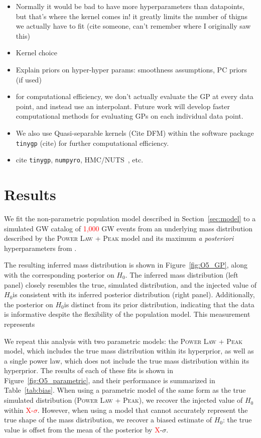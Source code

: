 \documentclass[]{aastex631}
\newcommand{\Ho}{$H_0$}
\newcommand{\plp}{\textsc{Power Law + Peak}}
\newcommand{\result}[1]{\textcolor{red}{#1}}
\begin{document}
\begin{itemize}
    \item Normally it would be bad to have more hyperparameters than datapoints, but that's where the kernel comes in! it greatly limits the number of thigns we actually have to fit (cite someone, can't remember where I originally saw this)
    \item Kernel choice   
    \item Explain priors on hyper-hyper params: smoothness assumptions, PC priors~\citep{simpson_penalising_2017} (if used)
    \item for computational efficiency, we don't actually evaluate the GP at every data point, and instead use an interpolant. Future work will develop faster computational methods for evaluating GPs on each individual data point.
    \item We also use Quasi-separable kernels (Cite DFM) within the software package \texttt{tinygp} (cite) for further computational efficiency. 
    \item cite \texttt{tinygp}, \texttt{numpyro}, HMC/NUTS~\citep{hoffman_no-u-turn_2011}, etc.
\end{itemize}
\section{Results}
\label{sec:results}
We fit the non-parametric population model described in Section~\ref{sec:model} to a simulated GW catalog of \result{1,000} GW events from an underlying mass distribution described by the \plp{} model and its maximum \emph{a posteriori} hyperparameters from \citet{o3b_pop}.

The resulting inferred mass distribution is shown in Figure~\ref{fig:O5_GP}, along with the corresponding posterior on \Ho.
The inferred mass distribution (left panel) closely resembles the true, simulated distribution, and the injected value of \Ho is consistent with its inferred posterior distribution (right panel).
Additionally, the posterior on \Ho is distinct from its prior distribution, indicating that the data is informative despite the flexibility of the population model.
This measurement represents 

We repeat this analysis with two parametric models: the \plp{} model, which includes the true mass distribution within its hyperprior, as well as a single power law, which does not include the true mass distribution within its hyperprior.
The results of each of these fits is shown in Figure~\ref{fig:O5_parametric}, and their performance is summarized in Table~\ref{tab:bias}.
When using a parametric model of the same form as the true simulated distribution (\plp), we recover the injected value of \Ho{} within \result{X-$\sigma$}.
However, when using a model that cannot accurately represent the true shape of the mass distribution, we recover a biased estimate of \Ho: the true value is offset from the mean of the posterior by \result{X}-$\sigma$.
\end{document}
